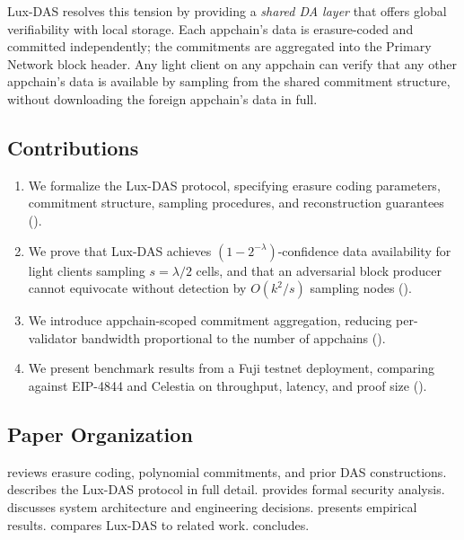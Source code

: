 \documentclass[11pt,a4paper]{article}
\theoremstyle{plain}
\theoremstyle{definition}
\theoremstyle{remark}
\begin{document}
Lux-DAS resolves this tension by providing a \emph{shared DA layer} that offers global
verifiability with local storage. Each appchain's data is erasure-coded and committed
independently; the commitments are aggregated into the Primary Network block header. Any
light client on any appchain can verify that any other appchain's data is available by sampling
from the shared commitment structure, without downloading the foreign appchain's data in full.

\subsection{Contributions}

\begin{enumerate}[leftmargin=*]
    \item We formalize the Lux-DAS protocol, specifying erasure coding parameters, commitment
          structure, sampling procedures, and reconstruction guarantees ().
    \item We prove that Lux-DAS achieves $(1 - 2^{-\lambda})$-confidence data availability for
          light clients sampling $s = \lambda / 2$ cells, and that an adversarial block producer
          cannot equivocate without detection by $O(k^2 / s)$ sampling nodes ().
    \item We introduce appchain-scoped commitment aggregation, reducing per-validator bandwidth
          proportional to the number of appchains ().
    \item We present benchmark results from a Fuji testnet deployment, comparing against
          EIP-4844 and Celestia on throughput, latency, and proof size ().
\end{enumerate}

\subsection{Paper Organization}

 reviews erasure coding, polynomial commitments, and prior DAS
constructions.  describes the Lux-DAS protocol in full detail.
 provides formal security analysis.  discusses
system architecture and engineering decisions.  presents empirical
results.  compares Lux-DAS to related work.  concludes.
\end{document}
